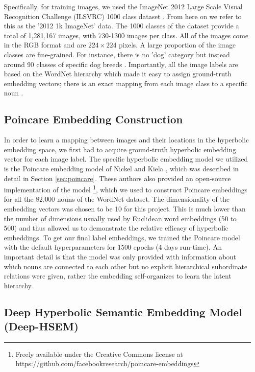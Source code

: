 \documentclass[12pt]{report}
\begin{document}
Specifically, for training images, we used the ImageNet 2012 Large Scale Visual Recognition Challenge (ILSVRC) 1000 class dataset \cite{Russakovsky2015, JiaDeng2009}. From here on we refer to this as the '2012 1k ImageNet' data. The 1000 classes of the dataset provide a total of 1,281,167 images, with 730-1300 images per class. All of the images come in the RGB format and are $224\times224$ pixels. A large proportion of the image classes are fine-grained. For instance, there is no 'dog' category but instead around 90 classes of specific dog breeds \cite{Russakovsky2015}. Importantly, all the image labels are based on the WordNet hierarchy which made it easy to assign ground-truth embedding vectors; there is an exact mapping from each image class to a specific noun \cite{Russakovsky2015}.

\subsection{Poincare Embedding Construction}
In order to learn a mapping between images and their locations in the hyperbolic embedding space, we first had to acquire ground-truth hyperbolic embedding vector for each image label. The specific hyperbolic embedding model we utilized is the Poincare embedding model of Nickel and Kiela \cite{Nickel2017}, which was described in detail in Section \ref{sec:poincare}. These authors also provided an open-source implementation of the model \footnote{\label{fb_fn} Freely available under the Creative Commons license at https://github.com/facebookresearch/poincare-embeddings}, which we used to construct Poincare embeddings for all the 82,000 nouns of the WordNet dataset. The dimensionality of the embedding vectors was chosen to be 10 for this project. This is much lower than the number of dimensions usually used by Euclidean word embeddings (50 to 500) and thus allowed us to demonstrate the relative efficacy of hyperbolic embeddings. To get our final label embeddings, we trained the Poincare model with the default hyperparameters for 1500 epochs (4 days run-time). An important detail is that the model was only provided with information about which nouns are connected to each other but no explicit hierarchical subordinate relations were given, rather the embedding self-organizes to learn the latent hierarchy.

\subsection{Deep Hyperbolic Semantic Embedding Model \\ (Deep-HSEM)}
\end{document}
